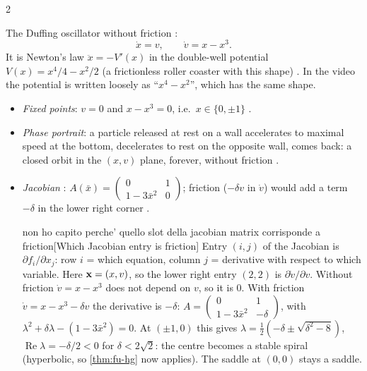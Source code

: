 \begin{paracol}{2}
\begin{casestudy}
The Duffing oscillator without friction :
\begin{equation}\label{eq:fu-duffing}
  \dot x=v,\qquad \dot v=x-x^3 .
\end{equation}
It is Newton's law $\ddot x=-V'(x)$ in the double-well potential $V(x)=x^4/4-x^2/2$ (a frictionless
roller coaster with this shape) . In the video the potential is written
loosely as ``$x^4-x^2$'', which has the same shape.
\begin{itemize}
  \item \emph{Fixed points}: $v=0$ and $x-x^3=0$, i.e.\ $x\in\{0,\pm1\}$ .
  \item \emph{Phase portrait}: a particle released at rest on a wall accelerates to maximal speed at the
        bottom, decelerates to rest on the opposite wall, comes back: a closed orbit in the $(x,v)$
        plane, forever, without friction .
  \item \emph{Jacobian} :
        $A(\bar x)=\begin{pmatrix}0&1\\1-3\bar x^2&0\end{pmatrix}$; friction ($-\delta v$ in $\dot v$) would add
        a term $-\delta$ in the lower right corner .\begin{answer}{non ho capito perche' quello slot della jacobian matrix corrisponde a friction}[Which Jacobian entry is friction]
        Entry $(i,j)$ of the Jacobian is $\partial f_i/\partial x_j$: row $i$ = which equation, column $j$ =
        derivative with respect to which variable. Here $\mathbf{x}=(x,v)$, so the lower right entry $(2,2)$ is
        $\partial\dot v/\partial v$. Without friction $\dot v=x-x^3$ does not depend on $v$, so it is $0$. With
        friction $\dot v=x-x^3-\delta v$ the derivative is $-\delta$:
        $A=\begin{pmatrix}0&1\\1-3\bar x^2&-\delta\end{pmatrix}$, with $\lambda^2+\delta\lambda-(1-3\bar x^2)=0$.
        At $(\pm1,0)$ this gives $\lambda=\tfrac12(-\delta\pm\sqrt{\delta^2-8})$, $\operatorname{Re}\lambda=-\delta/2<0$
        for $\delta<2\sqrt2$: the centre becomes a stable spiral (hyperbolic, so \cref{thm:fu-hg} now applies).
        The saddle at $(0,0)$ stays a saddle.
        \end{answer}

\end{itemize}
\end{casestudy}
\end{paracol}
